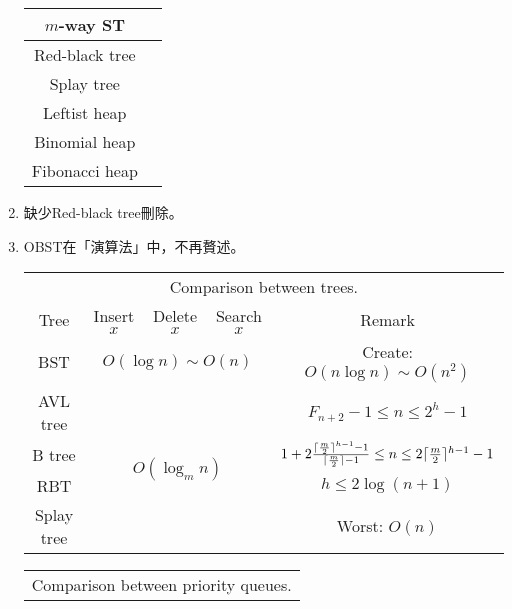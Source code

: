 \begin{enumerate}
\begin{table}[H]
\begin{tabular}{|c|c|}
            \hline
            $m$-way ST & \pageref{m-wayst} \\
            \hline
            Red-black tree & \pageref{rbt} \\
            \hline
            Splay tree & \pageref{splaytree} \\
            \hline
            Leftist heap & \pageref{leftistheap} \\
            \hline
            Binomial heap & \pageref{binomialheap} \\
            \hline
            Fibonacci heap & \pageref{fibheap} \\
            \hline
        \end{tabular}
    \end{table}
    \item 缺少Red-black tree刪除。
    \item OBST在「演算法」中，不再贅述。
    \begin{table}[H]
        \centering
        \begin{tabular}{|c|c|c|c|c|}
            \hline
            \multicolumn{5}{|c|}{Comparison between trees.} \\
            \Xhline{3\arrayrulewidth}
            Tree & Insert $x$ & Delete $x$ & Search $x$ & Remark \\
            \Xhline{2\arrayrulewidth}
            BST & \multicolumn{3}{c|}{$O(\log n) \sim O(n)$} & Create: $O(n\log n) \sim O(n^2)$ \\
            \hline
            AVL tree & \multicolumn{3}{c|}{\multirow{4}{*}{$O(\log_m n)$}} & $F_{n + 2} - 1 \le n \le 2^h - 1$ \\
            \cline{1-1}\cline{5-5}
            B tree & \multicolumn{3}{c|}{} & $1 + 2\frac{\lceil\frac{m}{2}\rceil^{h - 1} - 1}{\lceil\frac{m}{2}\rceil - 1} \le n \le 2\lceil\frac{m}{2}\rceil^{h - 1} - 1$ \\
            \cline{1-1}\cline{5-5}
            RBT & \multicolumn{3}{c|}{} & $h \le 2\log (n + 1)$ \\
            \cline{1-1}\cline{5-5}
            Splay tree & \multicolumn{3}{c|}{} & Worst: $O(n)$ \\
            \hline
        \end{tabular}
    \end{table}
    \begin{table}[H]
        \centering
        \begin{tabular}{|c|c|c|c|c|c|}
            \hline
            \multicolumn{6}{|c|}{Comparison between priority queues.} \\

\end{tabular}
\end{table}
\end{enumerate}
